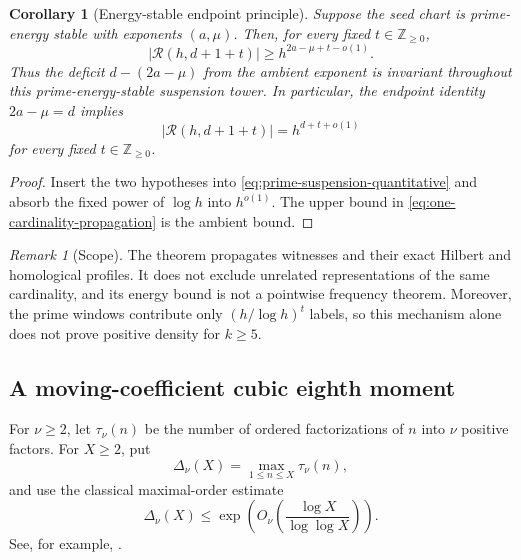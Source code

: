 \documentclass[11pt,reqno]{amsart}
\newtheorem{corollary}[theorem]{Corollary}
\theoremstyle{definition}
\theoremstyle{remark}
\newtheorem{remark}[theorem]{Remark}
\newcommand{\Rcal}{\mathcal R}
\begin{document}
\begin{corollary}[Energy-stable endpoint principle]
\label{cor:hereditary-endpoint}
Suppose the seed chart is prime-energy stable with exponents $(a,\mu)$.
Then, for every fixed $t\in\mathbb Z_{\geq0}$,
\begin{equation}\label{eq:amplifier-exponent}
 |\Rcal(h,d+1+t)|\geq h^{2a-\mu+t-o(1)}.
\end{equation}
Thus the deficit $d-(2a-\mu)$ from the ambient exponent is invariant throughout
this prime-energy-stable suspension tower.  In particular, the endpoint
identity $2a-\mu=d$ implies
\begin{equation}\label{eq:one-cardinality-propagation}
 |\Rcal(h,d+1+t)|=h^{d+t+o(1)}
\end{equation}
for every fixed $t\in\mathbb Z_{\geq0}$.
\end{corollary}

\begin{proof}
Insert the two hypotheses into
\eqref{eq:prime-suspension-quantitative} and absorb the fixed power of
$\log h$ into $h^{o(1)}$.  The upper bound in
\eqref{eq:one-cardinality-propagation} is the ambient bound.
\end{proof}

\begin{remark}[Scope]
\label{rem:amplifier-scope}
The theorem propagates witnesses and their exact Hilbert and homological
profiles.  It does not exclude unrelated representations of the same
cardinality, and its energy bound is not a pointwise frequency theorem.
Moreover, the prime windows contribute only $(h/\log h)^t$ labels, so this
mechanism alone does not prove positive density for $k\geq5$.
\end{remark}

\subsection{A moving-coefficient cubic eighth moment}

For $\nu\geq2$, let $\tau_\nu(n)$ be the number of ordered factorizations
of $n$ into $\nu$ positive factors.  For $X\geq2$, put
\begin{equation}\label{eq:maximal-divisor-function}
 \Delta_\nu(X)=\max_{1\leq n\leq X}\tau_\nu(n),
\end{equation}
and use the classical maximal-order estimate
\begin{equation}\label{eq:maximal-divisor-order}
 \Delta_\nu(X)\leq
 \exp\!\left(O_\nu\!\left(\frac{\log X}{\log\log X}\right)\right).
\end{equation}
See, for example, \cite[Chapter~I.5]{Tenenbaum2015}.
\end{document}
